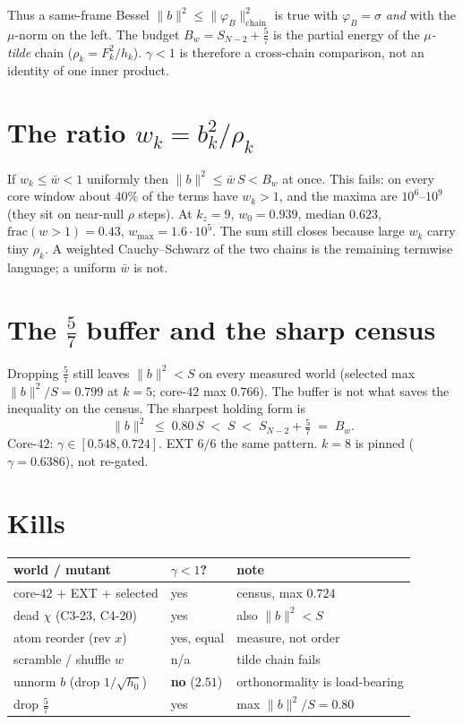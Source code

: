 \documentclass[11pt]{article}
\theoremstyle{remark}
\begin{document}
Thus a same-frame Bessel
$\|b\|^2\le\|\varphi_B\|^2_{\mathrm{chain}}$
is true with $\varphi_B=\sigma$
\emph{and} with the $\mu$-norm on the left.
The budget $B_w=S_{N-2}+\tfrac57$ is the
partial energy of the \emph{$\mu$-tilde} chain
($\rho_k=F_k^2/h_k$).
$\gamma<1$ is therefore a cross-chain
comparison, not an identity of one inner
product.

\section{The ratio $w_k=b_k^2/\rho_k$}\label{sec:w}

If $w_k\le\bar w<1$ uniformly then
$\|b\|^2\le\bar w\,S<B_w$ at once.
This fails: on every core window about $40\%$
of the terms have $w_k>1$, and the maxima
are $10^6$--$10^9$ (they sit on near-null
$\rho$ steps).
At $k_z=9$,
$w_0=0.939$, median $0.623$,
$\mathrm{frac}(w>1)=0.43$,
$w_{\max}=1.6\cdot10^5$.
The sum still closes because large $w_k$
carry tiny $\rho_k$.
A weighted Cauchy--Schwarz of the two chains
is the remaining termwise language;
a uniform $\bar w$ is not.

\section{The $\tfrac57$ buffer and the sharp census}\label{sec:buf}

Dropping $\tfrac57$ still leaves
$\|b\|^2<S$ on every measured world
(selected max $\|b\|^2/S=0.799$ at $k=5$;
core-$42$ max $0.766$).
The buffer is not what saves the inequality
on the census.
The sharpest holding form is
\[
  \|b\|^2
  \;\le\;
  0.80\,S
  \;<\;
  S
  \;<\;
  S_{N-2}+\tfrac57
  \;=\;
  B_w.
\]
Core-$42$: $\gamma\in[0.548,0.724]$.
EXT $6/6$ the same pattern.
$k=8$ is pinned ($\gamma=0.6386$), not re-gated.

\section{Kills}\label{sec:kills}

\begin{center}
\begin{tabular}{lll}
\toprule
world / mutant & $\gamma<1$? & note \\
\midrule
core-$42$ + EXT + selected & yes & census, max $0.724$ \\
dead $\chi$ (C3-23, C4-20) & yes & also $\|b\|^2<S$ \\
atom reorder (rev $x$) & yes, equal & measure, not order \\
scramble / shuffle $w$ & n/a & tilde chain fails \\
unnorm $b$ (drop $1/\sqrt{h_0}$) & \textbf{no} ($2.51$) & orthonormality is load-bearing \\
drop $\tfrac57$ & yes & max $\|b\|^2/S=0.80$ \\
\bottomrule
\end{tabular}
\end{center}
\end{document}
